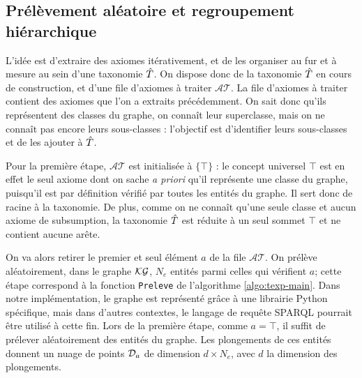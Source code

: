 \subsection{Prélèvement aléatoire et regroupement hiérarchique}
\label{subsec:texp-clustering}



L'idée est d'extraire des axiomes itérativement, et de les organiser au fur et à mesure au sein d'une taxonomie $\Tpred$. On dispose donc de la taxonomie $\Tpred$ en cours de construction, et d'une file d'axiomes à traiter $\mathcal{AT}$. 
%
La file d'axiomes à traiter contient des axiomes que l'on a extraits précédemment. On sait donc qu'ils représentent des classes du graphe, on connaît leur superclasse, mais on ne connaît pas encore leurs sous-classes : l'objectif est d'identifier leurs sous-classes et de les ajouter à $\Tpred$. 
%

Pour la première étape, $\mathcal{AT}$ est initialisée à $\{\top\}$ : le concept universel $\top$ est en effet le seul axiome dont on sache \textit{a priori} qu'il représente une classe du graphe, 
puisqu'il est par définition vérifié par toutes les entités du graphe. Il sert donc de racine à la taxonomie.
De plus, comme on ne connaît qu'une seule classe et aucun axiome de subsumption, la taxonomie $\Tpred$ est réduite à un seul sommet $\top$ et ne contient aucune arête. 

On va alors retirer le premier et seul élément $a$ de la file $\mathcal{AT}$.  %
On prélève aléatoirement, dans le graphe $\KG$, $N_e$ entités parmi celles qui vérifient $a$; cette étape correspond à la fonction \texttt{Preleve} de l'algorithme \ref{algo:texp-main}. Dans notre implémentation, le graphe est représenté grâce à une librairie Python spécifique, mais dans d'autres contextes, le langage de requête SPARQL pourrait être utilisé à cette fin.
%
Lors de la première étape, comme $a = \top$, il suffit de prélever aléatoirement des entités du graphe. Les plongements de ces entités donnent un nuage de points $\cal{D}_a$ de dimension $d \times N_e$, avec $d$ la dimension des plongements.

